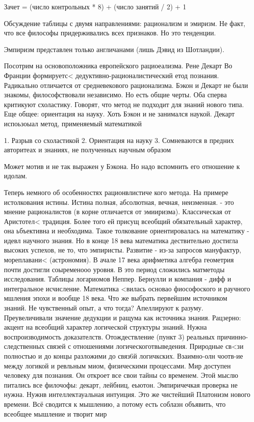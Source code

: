 Зачет = (число контрольных * 8) + (число занятий / 2) + 1

Обсуждение таблицы с двумя направлениями: рационализм и эмиризм. Не факт, что все философы придерживались всех признаков. Но это тенденции.

Эмпиризм представлен только англичанами (лишь Дэвид из Шотландии).

Посотрим на основоположника европейского рациоеализма. Рене Декарт
Во Франции формируетс< дедуктивно-рационалистический  етод познания. Радикально отличается от средневекового рационализма. Бэкон и Декарт не были знакомы, философствовали независимо. Но есть общие черты. Оба сперва критикуют схоластику. Говорят, что метод не подходит для знаний нового типа. Еще общее: ориентация на науку. Хоть Бэкон и не занимался наукой. Декарт испоьзоыал метод, применяемый математикой

	1. Разрыв со схоластикой
	2. Ориентация на науку
	3. Сомневаются в предних авторитеах и знаниях, не полученных научным образом

Может мотив и не так выражен у Бэкона. Но надо вспомнить его отношение к идолам.

Теперь немного об особенностях рационвлистиче кого метода. На примере истолкования истины.
Истина полная, абсолютная, вечная, неизменная. - это мнение рационалистов (в корне отличается от эмииризма). Классическая от Аристотел< традиция. Более того ей присущ всеобщий обязательный характер, она ьбъективна и необходима. Такое толкование ориентировалась на математику - идевл научного знания. Но в конце 18 вева математика дествительно достигла высоких успехов, не то, что эмпиристы. Развитие - из-за запросов мануфактур, мореплавани< (астрономия). В ачале 17 века арифметика алгебра  геометрия почти достигли соыременооо уровня. В это период сложились матметоды исследования. Таблицы логариомов Неппер. Бернулли и компания - дифф и интегральное исчисление. Математика <вилась основао фиософоского и раучного  мшления эпохи и вообще 18 века. Что же выбрать первейшим источником знаний. Не чувственный опыт, а что тогда? Апеллируют к разуму. Преувеличивали значение дедукции и ращума как источника знания. Рацзерно: акцент на всеобщий характер логической структуры знаний. Нужна воспроизводимость доказателств. 
Отождествление (пункт 3) реальных причинно-следственных связей с отношениями логическоготвыведения. Природные св<зи полностью и до концы разложими до связ6й логичкских. Взаимно-олн чоотв-ие между логикой и ревльным миом, физическими процессами. Мир доступен человеку для познания. Он откроет все свои тайны со временем. Этой мыслю питались все филочофы: декарт, лейбниц, еьютон. Эмпиричечкая проверка не нужна. Нужнв интеллектауальная интуиция. Это же чистейший Платонизм нового времени. Всё сводится к мышлению, а потому есть соблазн объявить, что всеобщее мышление и творит мир

